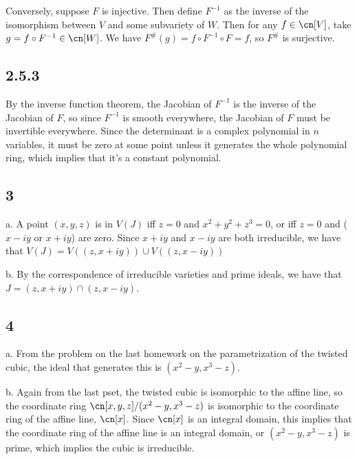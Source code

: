 \documentclass{article}
\begin{document}
Conversely, suppose $F$ is injective. Then define $F^{-1}$ as the inverse of the isomorphism between $V$ and some subvariety of $W$. Then for any $f\in\cn[V]$, take $g=f\circ F^{-1}\in\cn[W]$. We have $F^\#(g)=f\circ F^{-1}\circ F=f$, so $F^\#$ is surjective.
\subsection*{2.5.3}
By the inverse function theorem, the Jacobian of $F^{-1}$ is the inverse of the Jacobian of $F$, so since $F^{-1}$ is smooth everywhere, the Jacobian of $F$ must be invertible everywhere. Since the determinant is a complex polynomial in $n$ variables, it must be zero at some point unless it generates the whole polynomial ring, which implies that it's a constant polynomial.
\subsection*{3}
a. A point $(x,y,z)$ is in $V(J)$ iff $z=0$ and $x^2+y^2+z^3=0$, or iff $z=0$ and ($x-iy$ or $x+iy$) are zero. Since $x+iy$ and $x-iy$ are both irreducible, we have that $V(J)=V((z,x+iy))\cup V((z,x-iy))$

b. By the correspondence of irreducible varieties and prime ideals, we have that $J=(z,x+iy)\cap(z,x-iy)$.
\subsection*{4}
a. From the problem on the last homework on the parametrization of the twisted cubic, the ideal that generates this is $(x^2-y,x^3-z)$. 

b. Again from the last pset, the twisted cubic is isomorphic to the affine line, so the coordinate ring $\cn[x,y,z]/(x^2-y,x^3-z)$ is isomorphic to the coordinate ring of the affine line, $\cn[x]$. Since $\cn[x]$ is an integral domain, this implies that the coordinate ring of the affine line is an integral domain, or $(x^2-y,x^3-z)$ is prime, which implies the cubic is irreducible.
\end{document}
